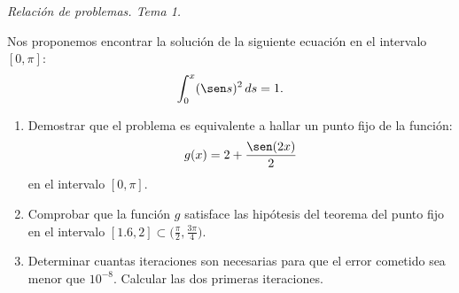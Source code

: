 \documentclass[11pt]{article}
\begin{document}
\begin{flushright}
  \LARGE\it Relación de problemas. Tema \huge 1.\\
  \bigskip
\end{flushright}

\begin{problemas}

   \begin{problema}
     Nos proponemos encontrar la solución de la siguiente ecuación en
     el intervalo $[0,\pi]$: 
     $$
     \int_0^x (\sen s)^2 \, ds = 1.
     $$
   \end{problema}
   \begin{enumerate}
   \item Demostrar que el problema es equivalente a hallar un punto
     fijo de la función:
     $$
     g(x)=2 + \frac{\sen(2x)}{2}
     $$
     en el intervalo $[0,\pi]$.
   \item Comprobar que la función $g$ satisface las hipótesis del
     teorema del punto fijo en el intervalo $\displaystyle [1.6,2]\subset
     \bigg(\frac{\pi}{2},\frac{3\pi}{4}\bigg)$.
   \item Determinar cuantas iteraciones son necesarias para que el
     error cometido sea menor que $10^{-8}$. Calcular las dos primeras
     iteraciones.
   \end{enumerate}
  
  \end{problemas}
\end{document}
